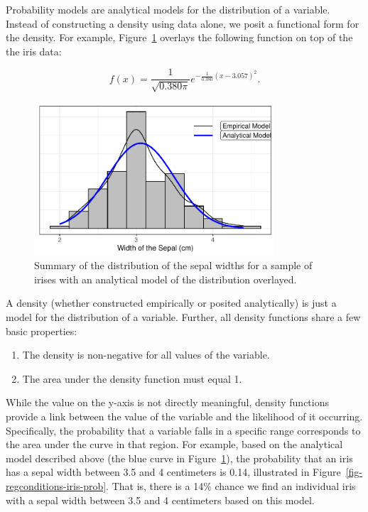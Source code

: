 \documentclass[
  letterpaper,
  DIV=11,
  numbers=noendperiod]{scrreprt}
\providecommand{\tightlist}{%
  \setlength{\itemsep}{0pt}\setlength{\parskip}{0pt}}\usepackage{longtable,booktabs,array}
\theoremstyle{plain}
\theoremstyle{definition}
\theoremstyle{definition}
\theoremstyle{remark}
\begin{document}
Probability models are analytical models for the distribution of a
variable. Instead of constructing a density using data alone, we posit a
functional form for the density. For example,
Figure~\ref{fig-regconditions-iris-normal} overlays the following
function on top of the the iris data:

\[f(x) = \frac{1}{\sqrt{0.380\pi}} e^{-\frac{1}{0.380}(x - 3.057)^2}.\]

\begin{figure}

{\centering \includegraphics[width=0.8\textwidth,height=\textheight]{./images/fig-regconditions-iris-normal-1.pdf}

}

\caption{\label{fig-regconditions-iris-normal}Summary of the
distribution of the sepal widths for a sample of irises with an
analytical model of the distribution overlayed.}

\end{figure}

A density (whether constructed empirically or posited analytically) is
just a model for the distribution of a variable. Further, all density
functions share a few basic properties:

\begin{enumerate}
\def\labelenumi{\arabic{enumi}.}
\tightlist
\item
  The density is non-negative for all values of the variable.
\item
  The area under the density function must equal 1.
\end{enumerate}

While the value on the y-axis is not directly meaningful, density
functions provide a link between the value of the variable and the
likelihood of it occurring. Specifically, the probability that a
variable falls in a specific range corresponds to the area under the
curve in that region. For example, based on the analytical model
described above (the blue curve in
Figure~\ref{fig-regconditions-iris-normal}), the probability that an
iris has a sepal width between 3.5 and 4 centimeters is 0.14,
illustrated in Figure~\ref{fig-regconditions-iris-prob}. That is, there
is a 14\% chance we find an individual iris with a sepal width between
3.5 and 4 centimeters based on this model.
\end{document}
